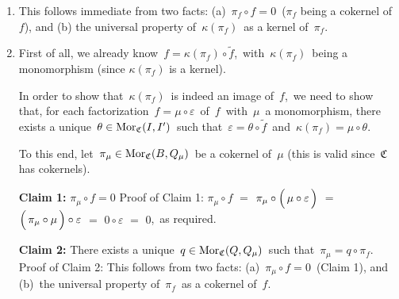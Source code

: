 \begin{enumerate}
\item
	This follows immediate from two facts:
	(a)	\,$\pi_{f} \circ f = 0$\, ($\pi_{f}$ being a cokernel of $f$), and
	(b)	the universal property of \,$\kappa(\pi_{f})$\, as a kernel of \,$\pi_{f}$.\,
\item
	First of all, we already know \,$f = \kappa(\pi_{f}) \circ \widetilde{f}$,\,
	with \,$\kappa(\pi_{f})$\, being a monomorphism (since $\kappa(\pi_{f})$ is a kernel).
	\begin{center}
	\end{center}
	In order to show that \,$\kappa(\pi_{f})$\, is indeed an image of \,$f$,\,
	we need to show that, for each factorization \,$f = \mu \circ \varepsilon$\, of \,$f$\,
	with \,$\mu$\, a monomorphism, there exists a unique \,$\theta \in \textnormal{Mor}_{\mathfrak{C}}(I,I^{\prime})$\,
	such that \,$\varepsilon = \theta \circ \widetilde{f}$\, and \,$\kappa(\pi_{f}) = \mu \circ \theta$.
	
	\vskip 0.1cm
	\noindent
	To this end, let \,$\pi_{\mu} \in \textnormal{Mor}_{\mathfrak{C}}(B,Q_{\mu})$\, be a cokernel of \,$\mu$
	(this is valid since \,{\color{red}$\mathfrak{C}$\, has cokernels}).\,

	\vskip 0.3cm
	\noindent
	\textbf{Claim 1:}\;\; $\pi_{\mu} \circ f = 0$
	\vskip -0.1cm
	\noindent
	Proof of Claim 1:\;
	$\pi_{\mu} \circ f$
	\;$=$\; $\pi_{\mu} \circ \left(\,\mu \overset{{\color{white}1}}{\circ}\varepsilon\,\right)$
	\;$=$\; $\left(\,\pi_{\mu} \overset{{\color{white}1}}{\circ} \mu \,\right) \circ \varepsilon$
	\;$=$\; $0 \circ \varepsilon$
	\;$=$\; $0$,\,
	as required.

	\vskip 0.3cm
	\noindent
	\textbf{Claim 2:}\;\; There exists a unique \,$q \in \textnormal{Mor}_{\mathfrak{C}}(Q,Q_{\mu})$\,
	such that \,$\pi_{\mu} = q \circ \pi_{f}$.\,
	\vskip 0.05cm
	\noindent
	Proof of Claim 2:\;
	This follows from two facts:\;
	(a)	\,$\pi_{\mu} \circ f = 0$\, (Claim 1), and
	(b)	\,the universal property of \,$\pi_{f}$\, as a cokernel of \,$f$.\,


\end{enumerate}

